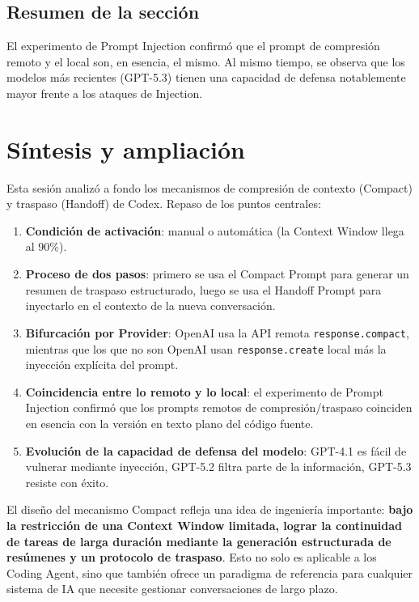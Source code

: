 \documentclass[a4paper]{article}
\begin{document}
\subsection{Resumen de la sección}

El experimento de Prompt Injection confirmó que el prompt de compresión remoto y el local son, en esencia, el mismo. Al mismo tiempo, se observa que los modelos más recientes (GPT-5.3) tienen una capacidad de defensa notablemente mayor frente a los ataques de Injection.
\section{Síntesis y ampliación}

Esta sesión analizó a fondo los mecanismos de compresión de contexto (Compact) y traspaso (Handoff) de Codex. Repaso de los puntos centrales:

\begin{enumerate}
    \item \textbf{Condición de activación}: manual o automática (la Context Window llega al 90\%).
    \item \textbf{Proceso de dos pasos}: primero se usa el Compact Prompt para generar un resumen de traspaso estructurado, luego se usa el Handoff Prompt para inyectarlo en el contexto de la nueva conversación.
    \item \textbf{Bifurcación por Provider}: OpenAI usa la API remota \texttt{response.compact}, mientras que los que no son OpenAI usan \texttt{response.create} local más la inyección explícita del prompt.
    \item \textbf{Coincidencia entre lo remoto y lo local}: el experimento de Prompt Injection confirmó que los prompts remotos de compresión/traspaso coinciden en esencia con la versión en texto plano del código fuente.
    \item \textbf{Evolución de la capacidad de defensa del modelo}: GPT-4.1 es fácil de vulnerar mediante inyección, GPT-5.2 filtra parte de la información, GPT-5.3 resiste con éxito.
\end{enumerate}

El diseño del mecanismo Compact refleja una idea de ingeniería importante: \textbf{bajo la restricción de una Context Window limitada, lograr la continuidad de tareas de larga duración mediante la generación estructurada de resúmenes y un protocolo de traspaso}. Esto no solo es aplicable a los Coding Agent, sino que también ofrece un paradigma de referencia para cualquier sistema de IA que necesite gestionar conversaciones de largo plazo.
\end{document}
